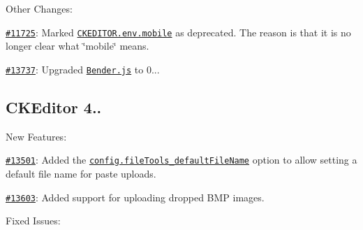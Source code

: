 Other Changes\+:


\begin{DoxyItemize}
\item \href{http://dev.ckeditor.com/ticket/11725}{\tt \#11725}\+: Marked \href{http://docs.ckeditor.com/#!/api/CKEDITOR.env-property-mobile}{\tt {\ttfamily C\+K\+E\+D\+I\+T\+O\+R.\+env.\+mobile}} as deprecated. The reason is that it is no longer clear what \char`\"{}mobile\char`\"{} means.
\item \href{http://dev.ckeditor.com/ticket/13737}{\tt \#13737}\+: Upgraded \href{https://github.com/benderjs/benderjs}{\tt Bender.\+js} to 0...
\end{DoxyItemize}

\subsection*{C\+K\+Editor 4..}

New Features\+:


\begin{DoxyItemize}
\item \href{http://dev.ckeditor.com/ticket/13501}{\tt \#13501}\+: Added the \href{http://docs.ckeditor.com/#!/api/CKEDITOR.config-cfg-fileTools_defaultFileName}{\tt {\ttfamily config.\+file\+Tools\+\_\+default\+File\+Name}} option to allow setting a default file name for paste uploads.
\item \href{http://dev.ckeditor.com/ticket/13603}{\tt \#13603}\+: Added support for uploading dropped B\+MP images.
\end{DoxyItemize}

Fixed Issues\+:


